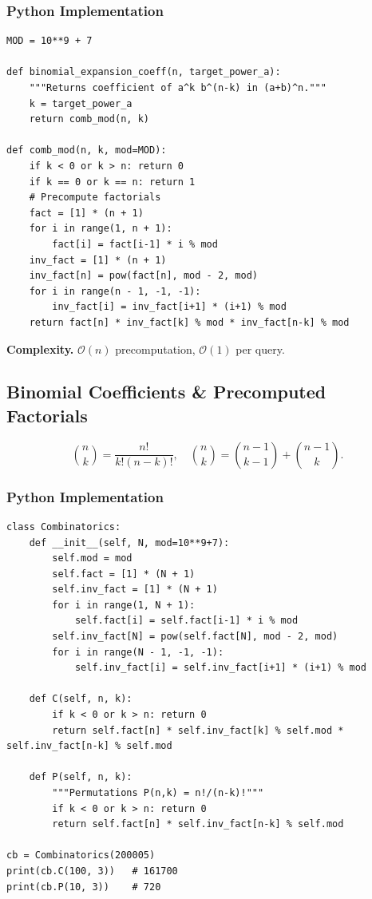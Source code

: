 \documentclass[10pt,a4paper]{article}
\theoremstyle{cpstyle}
\newcommand{\bigO}[1]{\mathcal{O}\!\left(#1\right)}
\begin{document}
\subsubsection{Python Implementation}
\begin{lstlisting}[caption={Binomial expansion and coefficient extraction}]
MOD = 10**9 + 7

def binomial_expansion_coeff(n, target_power_a):
    """Returns coefficient of a^k b^(n-k) in (a+b)^n."""
    k = target_power_a
    return comb_mod(n, k)

def comb_mod(n, k, mod=MOD):
    if k < 0 or k > n: return 0
    if k == 0 or k == n: return 1
    # Precompute factorials
    fact = [1] * (n + 1)
    for i in range(1, n + 1):
        fact[i] = fact[i-1] * i % mod
    inv_fact = [1] * (n + 1)
    inv_fact[n] = pow(fact[n], mod - 2, mod)
    for i in range(n - 1, -1, -1):
        inv_fact[i] = inv_fact[i+1] * (i+1) % mod
    return fact[n] * inv_fact[k] % mod * inv_fact[n-k] % mod
\end{lstlisting}

\textbf{Complexity.} $\bigO{n}$ precomputation, $\bigO{1}$ per query.

\subsection{Binomial Coefficients \& Precomputed Factorials}

\[
  \binom{n}{k} = \frac{n!}{k!(n-k)!}, \quad \binom{n}{k} = \binom{n-1}{k-1} + \binom{n-1}{k}.
\]

\subsubsection{Python Implementation}
\begin{lstlisting}[caption={Factorial precomputation for fast C(n,k) mod p}]
class Combinatorics:
    def __init__(self, N, mod=10**9+7):
        self.mod = mod
        self.fact = [1] * (N + 1)
        self.inv_fact = [1] * (N + 1)
        for i in range(1, N + 1):
            self.fact[i] = self.fact[i-1] * i % mod
        self.inv_fact[N] = pow(self.fact[N], mod - 2, mod)
        for i in range(N - 1, -1, -1):
            self.inv_fact[i] = self.inv_fact[i+1] * (i+1) % mod

    def C(self, n, k):
        if k < 0 or k > n: return 0
        return self.fact[n] * self.inv_fact[k] % self.mod * self.inv_fact[n-k] % self.mod

    def P(self, n, k):
        """Permutations P(n,k) = n!/(n-k)!"""
        if k < 0 or k > n: return 0
        return self.fact[n] * self.inv_fact[n-k] % self.mod

cb = Combinatorics(200005)
print(cb.C(100, 3))   # 161700
print(cb.P(10, 3))    # 720
\end{lstlisting}
\end{document}
